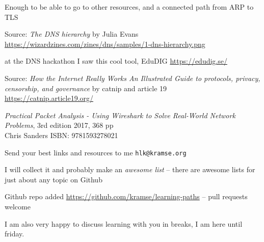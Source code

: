 \documentclass[Screen16to9,17pt]{foils}
\begin{document}
Enough to be able to go to other resources, and a connected path from ARP to TLS





{\small Source: \emph{The DNS hierarchy} by Julia Evans}\\
\url{https://wizardzines.com/zines/dns/samples/1-dns-hierarchy.png} {\color{red}\faHeart}



\begin{list2}
\item at the DNS hackathon I saw this cool tool, EduDIG \url{https://edudig.se/} {\color{red}\faHeart}
\end{list2}



{\small Source: \emph{How the Internet Really Works
An Illustrated Guide to protocols, privacy, censorship, and governance} by catnip and article 19}\\
\url{https://catnip.article19.org/} {\color{red}\faHeart}




\begin{list2}
\item \emph{Practical Packet Analysis - Using Wireshark to Solve Real-World Network Problems}, 3rd edition 2017, 368 pp\\
Chris Sanders ISBN: 9781593278021
\end{list2}


\begin{list2}
\item Send your best links and resources to me \verb+hlk@kramse.org+
\item I will collect it and probably make an \emph{awesome list} -- there are awesome lists for just about any topic on Github
\item Github repo added \url{https://github.com/kramse/learning-paths} -- pull requests welcome
\end{list2}

I am also very happy to discuss learning with you in breaks, I am here until friday.
\end{document}
